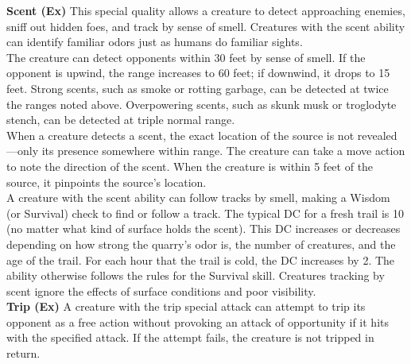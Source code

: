 \textbf{Scent (Ex)} This special quality allows a creature to detect approaching enemies, sniff out hidden foes, and track by sense of smell. Creatures with the scent ability can identify familiar odors just as humans do familiar sights. \\

The creature can detect opponents within 30 feet by sense of smell. If the opponent is upwind, the range increases to 60 feet; if downwind, it drops to 15 feet. Strong scents, such as smoke or rotting garbage, can be detected at twice the ranges noted above. Overpowering scents, such as skunk musk or troglodyte stench, can be detected at triple normal range. \\

When a creature detects a scent, the exact location of the source is not revealed—only its presence somewhere within range. The creature can take a move action to note the direction of the scent. When the creature is within 5 feet of the source, it pinpoints the source's location. \\

A creature with the scent ability can follow tracks by smell, making a Wisdom (or Survival) check to find or follow a track. The typical DC for a fresh trail is 10 (no matter what kind of surface holds the scent). This DC increases or decreases depending on how strong the quarry's odor is, the number of creatures, and the age of the trail. For each hour that the trail is cold, the DC increases by 2. The ability otherwise follows the rules for the Survival skill. Creatures tracking by scent ignore the effects of surface conditions and poor visibility. \\

\textbf{Trip (Ex)} A creature with the trip special attack can attempt to trip its opponent as a free action without provoking an attack of opportunity if it hits with the specified attack. If the attempt fails, the creature is not tripped in return. \\

\newpage
